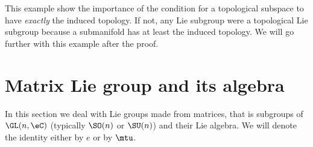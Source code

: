 This example show the importance of the condition for a topological subspace to have \emph{exactly} the induced topology. If not, any Lie subgroup were a topological Lie subgroup because a submanifold has at least the induced topology. We will go further with this example after the proof.

\section{Matrix Lie group and its algebra}
\label{SECooTSAJooNtjgMD}

In this section we deal with Lie groups made from matrices, that is subgroups of \( \GL(n, \eC)\) (typically \( \SO(n)\) or \( \SU(n)\)) and their Lie algebra. We will denote the identity either by \( e\) or by \( \mtu\).

